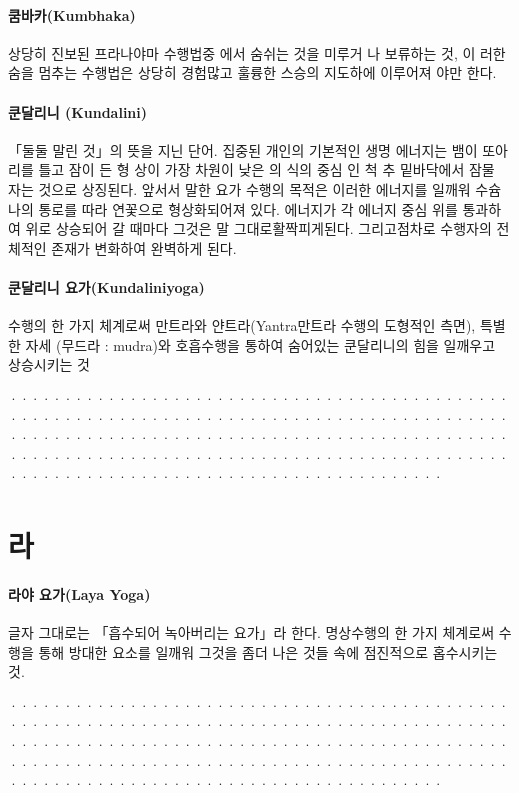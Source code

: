 \documentclass[12pt, a4paper, oneside]{book}
\let\stdsection\section
\renewcommand\section{\newpage\stdsection}
\begin{document}
\paragraph{쿰바카(Kumbhaka)}
상당히 진보된 프라나야마 수행법중 에서 숨쉬는 것을 미루거 나 보류하는 것, 이 러한 숨을 멈추는 수행법은 상당히 경험많고 훌륭한 스승의 지도하에 이루어져 야만 한다.

\paragraph{쿤달리니 (Kundalini)}
 「둘둘 말린 것」의 뜻을 지닌 단어. 집중된 개인의 기본적인 생명 에너지는 뱀이 또아리를 틀고 잠이 든 형 상이 가장 차원이 낮은 의 식의 중심 인 척 추 밑바닥에서 잠물 자는 것으로 상징된다. 앞서서 말한 요가 수행의 목적은 이러한 에너지를 일깨워 수슘나의 통로를 따라 연꽃으로 형상화되어져 있다. 에너지가 각 에너지 중심 위를 통과하여 위로 상승되어 갈 때마다 그것은 말 그대로활짝피게된다. 그리고점차로 수행자의 전체적인 존재가 변화하여 완벽하게 된다.

\paragraph{쿤달리니 요가(Kundaliniyoga)}
수행의 한 가지 체계로써 만트라와 얀트라(Yantra만트라 수행의 도형적인 측면), 특별한 자세 (무드라 : mudra)와 호흡수행을 통하여 숨어있는 쿤달리니의 힘을 일깨우고 상승시키는 것

································································································································································································································

\newpage
\section{라}

\paragraph{라야 요가(Laya Yoga)}
글자 그대로는 「흡수되어 녹아버리는 요가」라 한다. 명상수행의 한 가지 체계로써 수행을 통해 방대한 요소를 일깨워 그것을 좀더 나은 것들 속에 점진적으로 홉수시키는 것.

································································································································································································································
\end{document}
